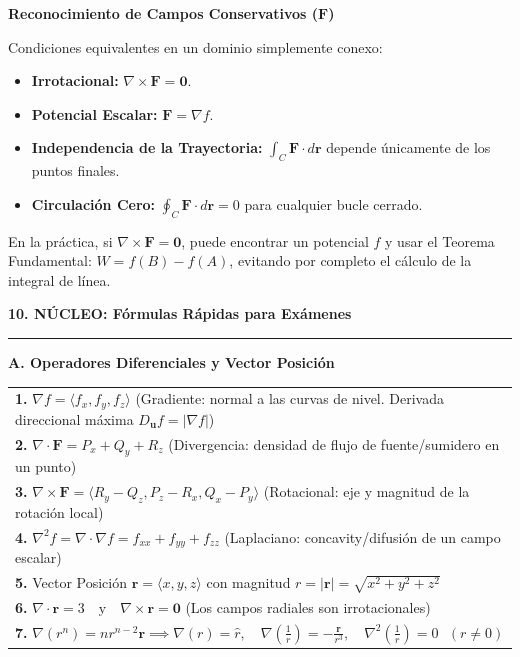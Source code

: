 \documentclass[10pt, landscape, twocolumn]{article}
\newcommand{\cheatsheetsection}[1]{
    \vspace{0.8em}
    {\color{themeblue}\large\bfseries #1} \par
    \vspace{-0.4em}
    {\color{themeblue}\rule{\linewidth}{1pt}} \par
    \vspace{0.3em}
}
\newcommand{\cheatsheetsubsection}[1]{
    \vspace{0.5em}
    {\color{themeblue}\normalsize\bfseries #1} \par
    \vspace{0.2em}
}
\begin{document}
\cheatsheetsubsection{Reconocimiento de Campos Conservativos ($\mathbf{F}$)}
Condiciones equivalentes en un dominio simplemente conexo:
\begin{itemize}[leftmargin=*, nosep]
    \item \textbf{Irrotacional:} $\nabla \times \mathbf{F} = \mathbf{0}$.
    \item \textbf{Potencial Escalar:} $\mathbf{F} = \nabla f$.
    \item \textbf{Independencia de la Trayectoria:} $\int_C \mathbf{F} \cdot d\mathbf{r}$ depende únicamente de los puntos finales.
    \item \textbf{Circulación Cero:} $\oint_C \mathbf{F} \cdot d\mathbf{r} = 0$ para cualquier bucle cerrado.
\end{itemize}
En la práctica, si $\nabla \times \mathbf{F} = \mathbf{0}$, puede encontrar un potencial $f$ y usar el Teorema Fundamental: $W = f(B) - f(A)$, evitando por completo el cálculo de la integral de línea.

\cheatsheetsection{10. \textbf{NÚCLEO}: Fórmulas Rápidas para Exámenes}
\vspace{0.2em}
\renewcommand{\arraystretch}{1.25}

{\color{themeblue}\normalsize\bfseries A. Operadores Diferenciales y Vector Posición} \par
\vspace{-0.2em}
\begin{tabularx}{\linewidth}{|X|}
\hline
\textbf{1.} $\nabla f = \langle f_x, f_y, f_z \rangle$ (Gradiente: normal a las curvas de nivel. Derivada direccional máxima $D_{\mathbf{u}}f = |\nabla f|$) \\
\textbf{2.} $\nabla \cdot \mathbf{F} = P_x + Q_y + R_z$ (Divergencia: densidad de flujo de fuente/sumidero en un punto) \\
\textbf{3.} $\nabla \times \mathbf{F} = \langle R_y-Q_z, P_z-R_x, Q_x-P_y \rangle$ (Rotacional: eje y magnitud de la rotación local) \\
\textbf{4.} $\nabla^2 f = \nabla \cdot \nabla f = f_{xx} + f_{yy} + f_{zz}$ (Laplaciano: concavity/difusión de un campo escalar) \\
\textbf{5.} Vector Posición $\mathbf{r} = \langle x, y, z \rangle$ con magnitud $r = |\mathbf{r}| = \sqrt{x^2+y^2+z^2}$ \\
\textbf{6.} $\nabla \cdot \mathbf{r} = 3 \quad \text{y} \quad \nabla \times \mathbf{r} = \mathbf{0}$ (Los campos radiales son irrotacionales) \\
\textbf{7.} $\nabla (r^n) = n r^{n-2} \mathbf{r} \implies \nabla(r) = \hat{r}, \quad \nabla\left(\frac{1}{r}\right) = -\frac{\mathbf{r}}{r^3}, \quad \nabla^2\left(\frac{1}{r}\right) = 0 \text{ } (r \neq 0)$ \\
\hline
\end{tabularx}
\end{document}
